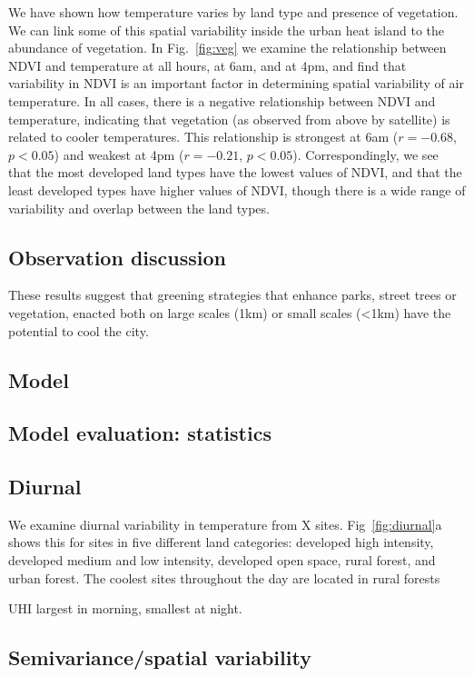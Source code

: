 \documentclass[draft,linenumbers]{agujournal}
\begin{document}
We have shown how temperature varies by land type and presence of vegetation. We can link some of this spatial variability inside the urban heat island to the abundance of vegetation. In Fig.~\ref{fig:veg} we examine the relationship between NDVI and temperature at all hours, at 6am, and at 4pm, and find that variability in NDVI is an important factor in determining spatial variability of air temperature. In all cases, there is a negative relationship between NDVI and temperature, indicating that vegetation (as observed from above by satellite) is related to cooler temperatures. This relationship is strongest at 6am ($r = -0.68$, $p< 0.05$) and weakest at 4pm ($r= -0.21$, $p<0.05$). Correspondingly, we see that the most developed land types have the lowest values of NDVI, and that the least developed types have higher values of NDVI, though there is a wide range of variability and overlap between the land types. 

\subsection{Observation discussion}

These results suggest that greening strategies that enhance parks, street trees or vegetation, enacted both on large scales (1km) or small scales (<1km) have the potential to cool the city. 
\subsection{Model}

\subsection{Model evaluation: statistics}

\subsection{Diurnal}
We examine diurnal variability in temperature from X sites. Fig~\ref{fig:diurnal}a shows this for sites in five different land categories: developed high intensity, developed medium and low intensity, developed open space, rural forest, and urban forest. The coolest sites throughout the day are located in rural forests

UHI largest in morning, smallest at night. 



\subsection{Semivariance/spatial variability}
\end{document}
